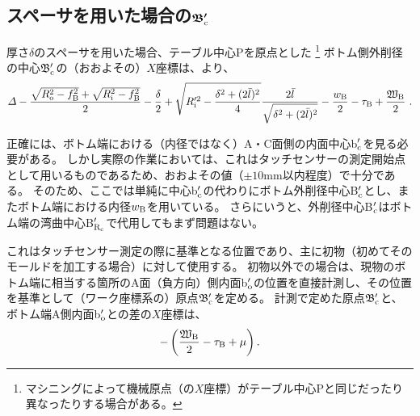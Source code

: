 \subsection[スペーサを用いた場合の$\mathfrak B_\text c'$]
           {スペーサを用いた場合の$\boldsymbol{\mathfrak B_\text c'}$}
厚さ$\delta$のスペーサを用いた場合、テーブル中心Pを原点とした
\footnote{マシニングによって機械原点（の$X$座標）がテーブル中心Pと同じだったり異なったりする場合がある。}\relax
ボトム側外削径の中心$\mathfrak B_\text c'$の（おおよその）$X$座標は、より、
\begin{align*}
  \varDelta-\frac{\sqrt{R_\text o^2-f_\text B^2}+\sqrt{R_\text i^2-f_\text B^2}}2-\frac\delta2+\sqrt{R_\text i'^2-\frac{\delta^2+(2\bar l)^2}4}\frac{2\bar l}{\sqrt{\delta^2+(2\bar l)^2}}
  -\frac{w_\text B}2-\tau_\text B+\frac{\mathfrak W_\text B}2\ .
\end{align*}
\begin{hosokubox}
正確には、ボトム端における（内径ではなく）A・C面側の内面中心b$_\text c'$を見る必要がある。
しかし実際の作業においては、これはタッチセンサーの測定開始点として用いるものであるため、おおよその値（$\pm10$mm以内程度）で十分である。
そのため、ここでは単純に中心b$_\text c'$の代わりにボトム外削径中心B$_\text c'$とし、またボトム端における内径$w_\text B$を用いている。
さらにいうと、外削径中心B$_\text c'$はボトム端の湾曲中心B$_{\text R_\text c}'$で代用してもまず問題はない。
\end{hosokubox}
これはタッチセンサー測定の際に基準となる位置であり、主に初物（初めてそのモールドを加工する場合）に対して使用する。
初物以外での場合は、現物のボトム端に相当する箇所のA面（負方向）側内面b$_\text o'$の位置を直接計測し、その位置を基準として（ワーク座標系の）原点$\mathfrak B_\text c'$を定める。
計測で定めた原点$\mathfrak B_\text c'$と、ボトム端A側内面b$_\text o'$との差の$X$座標は、
\begin{align*}
  -\left(\frac{\mathfrak W_\text B}2-\tau_\text B+\mu\right).
\end{align*}


